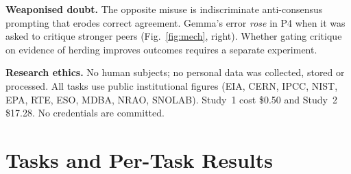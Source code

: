 \documentclass[10pt]{article}
\theoremstyle{manuscript}\newtheorem{proposition}{Proposition}
\begin{document}
\textbf{Weaponised doubt.} The opposite misuse is indiscriminate anti-consensus prompting that erodes correct agreement. Gemma's error \emph{rose} in P4 when it was asked to critique stronger peers (Fig.~\ref{fig:mech}, right). Whether gating critique on evidence of herding improves outcomes requires a separate experiment.

\textbf{Research ethics.} No human subjects; no personal data was collected, stored or processed. All tasks use public institutional figures (EIA, CERN, IPCC, NIST, EPA, RTE, ESO, MDBA, NRAO, SNOLAB). Study~1 cost \$0.50 and Study~2 \$17.28. No credentials are committed.

\section{Tasks and Per-Task Results}
\end{document}
